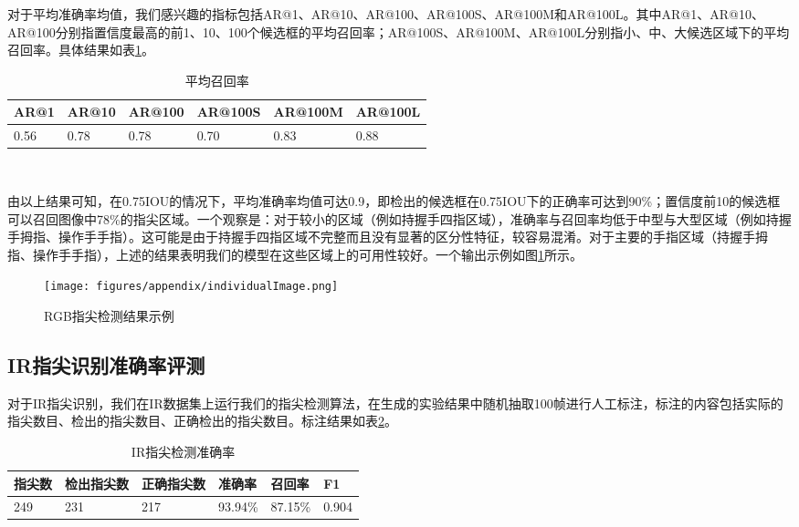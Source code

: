 对于平均准确率均值，我们感兴趣的指标包括AR@1、AR@10、AR@100、AR@100S、AR@100M和AR@100L。其中AR@1、AR@10、AR@100分别指置信度最高的前1、10、100个候选框的平均召回率；AR@100S、AR@100M、AR@100L分别指小、中、大候选区域下的平均召回率。具体结果如表\ref{tbl:fingertip_recall}。

\begin{table}[htbp]
\centering
\caption{平均召回率}
\label{tbl:fingertip_recall}
\begin{tabular}{p{60 pt}p{60 pt}p{60 pt}p{60 pt}p{60 pt}p{60 pt}}
 \toprule
  AR@1 & AR@10 & AR@100 & AR@100S & AR@100M & AR@100L\\
 \midrule
    0.56 & 0.78 & 0.78 & 0.70 & 0.83 & 0.88 \\
\bottomrule
 \end{tabular}\\[2pt]
\end{table}

由以上结果可知，在0.75IOU的情况下，平均准确率均值可达0.9，即检出的候选框在0.75IOU下的正确率可达到90\%；置信度前10的候选框可以召回图像中78\%的指尖区域。一个观察是：对于较小的区域（例如持握手四指区域），准确率与召回率均低于中型与大型区域（例如持握手拇指、操作手手指）。这可能是由于持握手四指区域不完整而且没有显著的区分性特征，较容易混淆。对于主要的手指区域（持握手拇指、操作手手指），上述的结果表明我们的模型在这些区域上的可用性较好。一个输出示例如图\ref{fig:rgb_example}所示。

\begin{figure}[h]
  \centering
  \texttt{[image: figures/appendix/individualImage.png]}
  \caption{RGB指尖检测结果示例}
  \label{fig:rgb_example}
\end{figure}

\subsection{IR指尖识别准确率评测}

对于IR指尖识别，我们在IR数据集上运行我们的指尖检测算法，在生成的实验结果中随机抽取100帧进行人工标注，标注的内容包括实际的指尖数目、检出的指尖数目、正确检出的指尖数目。标注结果如表\ref{tbl:fingertip_ir_result}。


\begin{table}[htbp]
\centering
\caption{IR指尖检测准确率}
\label{tbl:fingertip_ir_result}
\begin{tabular}{p{60 pt}p{60 pt}p{60 pt}p{60 pt}p{60 pt}p{60 pt}}
 \toprule
   指尖数 & 检出指尖数 & 正确指尖数 & 准确率 & 召回率 & F1 \\
 \midrule
    249 & 231 & 217 & 93.94\% & 87.15\% & 0.904 \\
\bottomrule
 \end{tabular}\\[2pt]
\end{table}


